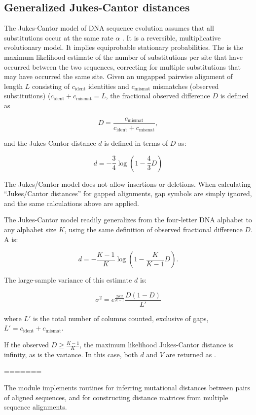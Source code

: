 \subsection{Generalized Jukes-Cantor distances}

The Jukes-Cantor model of DNA sequence evolution assumes that all
substitutions occur at the same rate $\alpha$
\citep{JukesCantor69}. It is a reversible, multiplicative evolutionary
model. It implies equiprobable stationary probabilities. The
 is the maximum likelihood estimate of
the number of substitutions per site that have occurred between the
two sequences, correcting for multiple substitutions that may have
occurred the same site. Given an ungapped pairwise alignment of length
$L$ consisting of $c_{\mbox{ident}}$ identities and
$c_{\mbox{mismat}}$ mismatches (observed substitutions)
($c_{\mbox{ident}} + c_{\mbox{mismat}} = L$, the fractional observed
difference $D$ is defined as

\[
  D = \frac{c_{\mbox{mismat}}}{c_{\mbox{ident}} + c_{\mbox{mismat}}},
\]

and the Jukes-Cantor distance $d$ is defined in terms of $D$ as:

\[
  d = -\frac{3}{4} \log \left( 1 - \frac{4}{3} D \right)
\]

The Jukes/Cantor model does not allow insertions or deletions.  When
calculating ``Jukes/Cantor distances'' for gapped alignments, gap
symbols are simply ignored, and the same calculations above are
applied.

The Jukes-Cantor model readily generalizes from the four-letter DNA
alphabet to any alphabet size $K$, using the same definition of
observed fractional difference $D$. A  is:

\[
  d = -\frac{K-1}{K} \log \left( 1 - \frac{K}{K-1} D \right).
\]

The large-sample variance of this estimate $d$ is:

\[
   \sigma^2 = e^\frac{2Kd}{K-1} \frac{D(1-D)}{L'}
\]

where $L'$ is the total number of columns counted, exclusive of gaps,
$L' = c_{\mbox{ident}} + c_{\mbox{mismat}}$.

If the observed $D \geq \frac{K-1}{K}$, the maximum likelihood
Jukes-Cantor distance is infinity, as is the variance. In this case,
both $d$ and $V$ are returned as . 


=======

The  module implements routines for inferring
mutational distances between pairs of aligned sequences, and for
constructing distance matrices from multiple sequence alignments.

